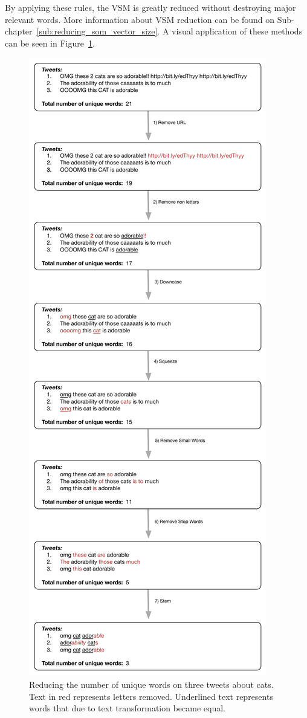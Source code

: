 \documentclass[journal]{IEEEtran}
\begin{document}
By applying these rules, the \ac{VSM} is greatly reduced without destroying major relevant words. More information about \ac{VSM} reduction can be found on Sub-chapter~\ref{sub:reducing_som_vector_size}. A visual application of these methods can be seen in Figure~\ref{fig:string_reduction}.
\begin{figure}[h]
  \centering
  \includegraphics[width=0.8\linewidth]{./images/string_reduction.pdf}
  \caption{Reducing the number of unique words on three tweets about cats. Text in red represents letters removed. Underlined text represents words that due to text transformation became equal.}
  \label{fig:string_reduction}
\end{figure}
\end{document}
